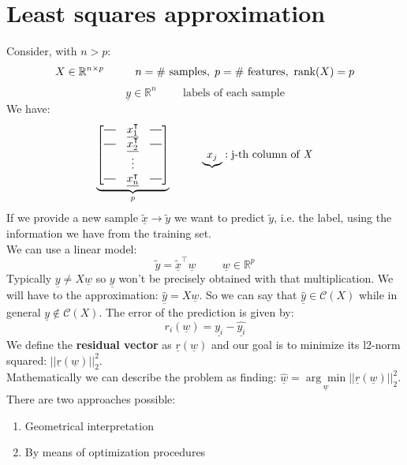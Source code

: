 \section{Least squares approximation}
Consider, with $n > p$: 
\[
    X \in \mathbb{R}^{n \times p} \hspace{1cm} n = \text{\# samples}, \hspace{0.1cm} p = \text{\# features}, \text{ rank(}X\text{)} = p   
\]
\[
    \underline{y} \in \mathbb{R}^n \hspace{1cm} \text{labels of each sample}    
\]
We have:
\[
\underbrace{
\begin{bmatrix}
    \horzbar & \underline{x_1^\intercal} & \horzbar\\
    \horzbar & \underline{x_2^\intercal} & \horzbar\\    
     & \vdots & \\
    \horzbar & \underline{x_n^\intercal} & \horzbar
\end{bmatrix}}_{p}
\hspace{1cm}
\underbrace{x_j}: \text{j-th column of \emph{X}}
\]
If we provide a new sample $\tilde{\underline{x}} \rightarrow \tilde{y}$ we want to predict $\tilde{y}$, i.e. the label, using the information we have from the training set.\\
We can use a linear model:
\[
    \tilde{y} = \tilde{\underline{x}}^\intercal \underline{w} \hspace{1cm} \underline{w} \in \mathbb{R}^p
\]
Typically $\underline{y} \neq X\underline{w}$ so $\underline{y}$ won't be precisely obtained with that multiplication. We will have to the approximation: $\hat{\underline{y}} = X\underline{w}$. So we can say that $\hat{\underline{y}} \in \mathcal{C}(X)$ while in general $\underline{y} \notin \mathcal{C}(X)$.
The error of the prediction is given by:
\[
    r_i(\underline{w}) = \underline{y_i} - \underline{\hat{y_i}}    
\] 
We define the \textbf{residual vector} as $\underline{r}(\underline{w})$ and our goal is to minimize its l2-norm squared: $||\underline{r}(\underline{w})||^2_2$.\\

Mathematically we can describe the problem as finding: $\hat{\underline{w}} = \underset{\underline{w}}{\arg\min}||\underline{r}(\underline{w})||^2_2$. There are two approaches possible:
\begin{enumerate}
    \item Geometrical interpretation
    \item By means of optimization procedures
\end{enumerate}
